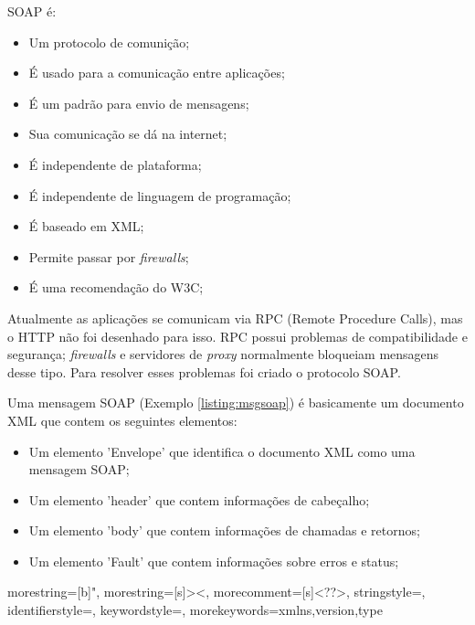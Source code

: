 SOAP é:

\begin{itemize}
	\item Um protocolo de comunição;
	\item É usado para a comunicação entre aplicações;
	\item É um padrão para envio de mensagens;
	\item Sua comunicação se dá na internet;
	\item É independente de plataforma;
	\item É independente de linguagem de programação;
	\item É baseado em XML;
	\item Permite passar por \textit{firewalls};
	\item É uma recomendação do W3C;
\end{itemize}

Atualmente as aplicações se comunicam via RPC (Remote Procedure Calls), mas o HTTP não foi desenhado para isso. RPC possui problemas de compatibilidade e segurança; \textit{firewalls} e servidores de \textit{proxy} normalmente bloqueiam mensagens desse tipo. Para resolver esses problemas foi criado o protocolo SOAP.

Uma mensagem SOAP (Exemplo \ref{listing:msgsoap}) é basicamente um documento XML que contem os seguintes elementos:

\begin{itemize}
	\item Um elemento 'Envelope' que identifica o documento XML como uma mensagem SOAP;
	\item Um elemento 'header' que contem informações de cabeçalho;
	\item Um elemento 'body' que contem informações de chamadas e retornos;
	\item Um elemento 'Fault' que contem informações sobre erros e status;
\end{itemize}




{
  morestring=[b]",
  morestring=[s]{>}{<},
  morecomment=[s]{<?}{?>},
  stringstyle=\color{black},
  identifierstyle=\color{darkblue},
  keywordstyle=\color{cyan},
  morekeywords={xmlns,version,type}%
}


